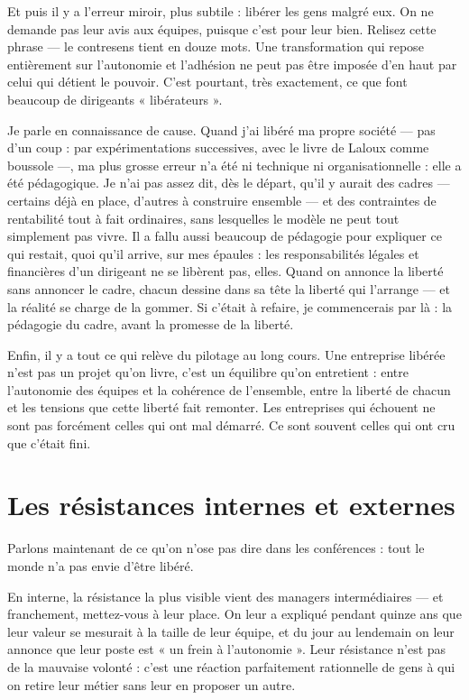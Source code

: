 Et puis il y a l'erreur miroir, plus subtile : libérer les gens malgré eux. On ne demande pas leur avis aux équipes, puisque c'est pour leur bien. Relisez cette phrase — le contresens tient en douze mots. Une transformation qui repose entièrement sur l'autonomie et l'adhésion ne peut pas être imposée d'en haut par celui qui détient le pouvoir. C'est pourtant, très exactement, ce que font beaucoup de dirigeants « libérateurs ».

Je parle en connaissance de cause. Quand j'ai libéré ma propre société — pas d'un coup : par expérimentations successives, avec le livre de Laloux comme boussole —, ma plus grosse erreur n'a été ni technique ni organisationnelle : elle a été pédagogique. Je n'ai pas assez dit, dès le départ, qu'il y aurait des cadres — certains déjà en place, d'autres à construire ensemble — et des contraintes de rentabilité tout à fait ordinaires, sans lesquelles le modèle ne peut tout simplement pas vivre. Il a fallu aussi beaucoup de pédagogie pour expliquer ce qui restait, quoi qu'il arrive, sur mes épaules : les responsabilités légales et financières d'un dirigeant ne se libèrent pas, elles. Quand on annonce la liberté sans annoncer le cadre, chacun dessine dans sa tête la liberté qui l'arrange — et la réalité se charge de la gommer. Si c'était à refaire, je commencerais par là : la pédagogie du cadre, avant la promesse de la liberté.

Enfin, il y a tout ce qui relève du pilotage au long cours. Une entreprise libérée n'est pas un projet qu'on livre, c'est un équilibre qu'on entretient : entre l'autonomie des équipes et la cohérence de l'ensemble, entre la liberté de chacun et les tensions que cette liberté fait remonter. Les entreprises qui échouent ne sont pas forcément celles qui ont mal démarré. Ce sont souvent celles qui ont cru que c'était fini.

\section{Les résistances internes et externes}

Parlons maintenant de ce qu'on n'ose pas dire dans les conférences : tout le monde n'a pas envie d'être libéré.

En interne, la résistance la plus visible vient des managers intermédiaires — et franchement, mettez-vous à leur place. On leur a expliqué pendant quinze ans que leur valeur se mesurait à la taille de leur équipe, et du jour au lendemain on leur annonce que leur poste est « un frein à l'autonomie ». Leur résistance n'est pas de la mauvaise volonté : c'est une réaction parfaitement rationnelle de gens à qui on retire leur métier sans leur en proposer un autre.

